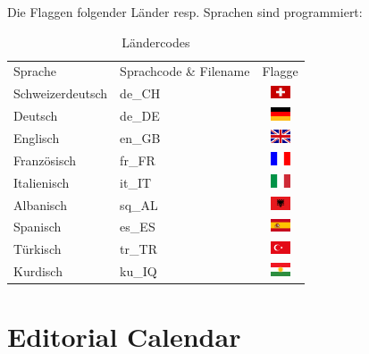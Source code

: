 \documentclass[a4paper,11pt,twoside,titlepage,openright]{report}
\numberwithin{equation}{section}		%
\numberwithin{figure}{section}			%
\numberwithin{table}{section}				%
\begin{document}
Die Flaggen folgender Länder resp. Sprachen sind programmiert:

\begin{table}[H]
\centering
\begin{tabular}{ l p{2.5cm} c }
Sprache 			& Sprachcode \& Filename	& Flagge\\
Schweizerdeutsch	& de\_CH		& \includegraphics[width=22px]{Images/de_CH.png}\\
Deutsch				& de\_DE		& \includegraphics[width=22px]{Images/de_DE.png}\\
Englisch			& en\_GB		& \includegraphics[width=22px]{Images/en_GB.png}\\
Französisch			& fr\_FR		& \includegraphics[width=22px]{Images/fr_FR.png}\\
Italienisch			& it\_IT		& \includegraphics[width=22px]{Images/it_IT.png}\\
Albanisch			& sq\_AL		& \includegraphics[width=22px]{Images/sq_AL.png}\\
Spanisch         	& es\_ES		& \includegraphics[width=22px]{Images/es_ES.png}\\
Türkisch			& tr\_TR		& \includegraphics[width=22px]{Images/tr_TR.png}\\
Kurdisch			& ku\_IQ		& \includegraphics[width=22px]{Images/ku_IQ.png}\\
\end{tabular}
\caption{Ländercodes}
\end{table}

\section{Editorial Calendar}
\end{document}
